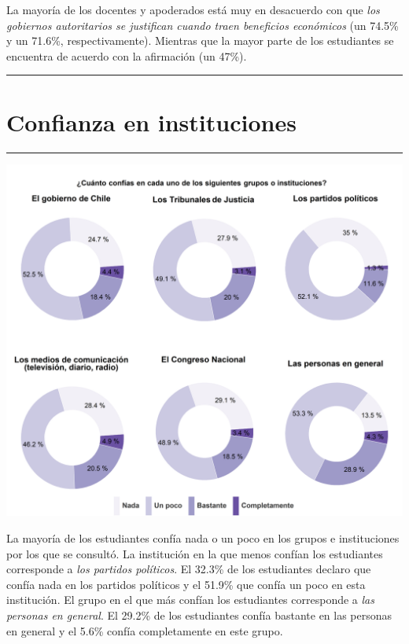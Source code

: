 \documentclass[
  14pt,
]{book}
\let\origfigure\figure
\let\endorigfigure\endfigure
\renewenvironment{figure}[1][2] {
  \expandafter\origfigure\expandafter[H]
} {
  \endorigfigure
}
\begin{document}
La mayoría de los docentes y apoderados está muy en desacuerdo con que \emph{los gobiernos autoritarios se justifican cuando traen beneficios económicos} (un 74.5\% y un 71.6\%, respectivamente). Mientras que la mayor parte de los estudiantes se encuentra de acuerdo con la afirmación (un 47\%).

\begin{center}\rule{0.5\linewidth}{0.5pt}\end{center}

\hypertarget{confianza-en-instituciones}{%
\section{Confianza en instituciones}\label{confianza-en-instituciones}}

\begin{center}\rule{0.5\linewidth}{0.5pt}\end{center}

\begin{figure}[!ht]

{\centering \includegraphics[width=0.8\linewidth,]{images/graph_cgp} 

}

\caption{Confianza en grupos e instituciones}\label{fig:unnamed-chunk-51}
\end{figure}

La mayoría de los estudiantes confía nada o un poco en los grupos e instituciones por los que se consultó. La institución en la que menos confían los estudiantes corresponde a \emph{los partidos políticos}. El 32.3\% de los estudiantes declaro que confía nada en los partidos políticos y el 51.9\% que confía un poco en esta institución. El grupo en el que más confían los estudiantes corresponde a \emph{las personas en general}. El 29.2\% de los estudiantes confía bastante en las personas en general y el 5.6\% confía completamente en este grupo.
\end{document}
